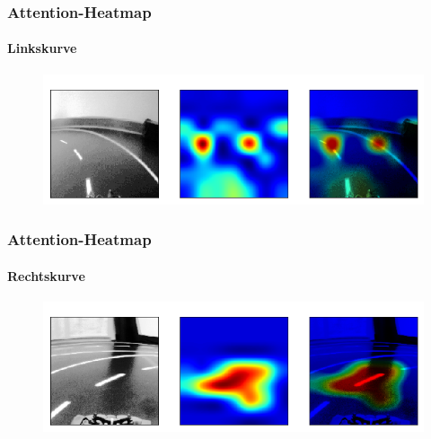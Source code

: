 \documentclass{beamer}
\begin{document}
\begin{frame}
\frametitle{Attention-Heatmap}
\framesubtitle{Linkskurve}
\begin{figure}
	\centering
	\includegraphics[width=\linewidth]{figures/left.png}	 
	\label{img:left}
	\end{figure}
\end{frame}

\begin{frame}
\frametitle{Attention-Heatmap}
\framesubtitle{Rechtskurve}
\begin{figure}
	\centering
	\includegraphics[width=\linewidth]{figures/right.png}	 
	\label{img:right}
	\end{figure}
\end{frame}
\end{document}
